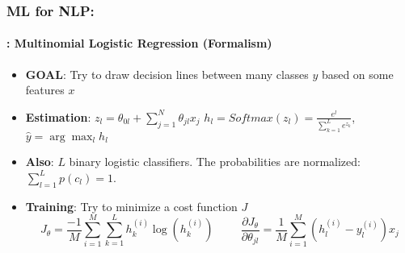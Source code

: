 \documentclass[xcolor=table]{beamer}
\begin{document}
	\begin{frame}
		\frametitle{ML for NLP: \insertsection}
		\framesubtitle{\insertsubsection: Multinomial Logistic Regression (Formalism)}
		
		\begin{minipage}{0.7\textwidth} 
			\begin{itemize}
				\item \textbf{GOAL}: Try to draw decision lines between many classes $ y $ based on some features $ x $
				\item \textbf{Estimation}: $ z_l = \theta_{0l} + \sum_{j=1}^{N} \theta_{jl} x_j $
				$ h_l = Softmax(z_l) = \frac{e^l}{\sum_{k=1}^{L} e^{z_k}}$, $ \hat{y} = \arg\max_{l} h_l$
				\item \textbf{Also}: $ L $ binary logistic classifiers. 
				The probabilities are normalized: $ \sum_{l=1}^{L} p(c_l) = 1$.
			\end{itemize}
		\end{minipage}
		\begin{minipage}{0.29\textwidth} 
		\end{minipage}
	
		\begin{itemize}
			\item \textbf{Training}: Try to minimize a cost function $ J $
			\[J_\theta = \frac{-1}{M} \sum\limits_{i=1}^{M} \sum_{k=1}^{L} h^{(i)}_k \log(h^{(i)}_k)
			\hspace{1cm}
			\frac{\partial J_\theta}{\partial \theta_{jl}} = \frac{1}{M} \sum\limits_{i=1}^{M} (h_l^{(i)} - y_l^{(i)}) x_j
			\]
		\end{itemize}
		
	\end{frame}
\end{document}
